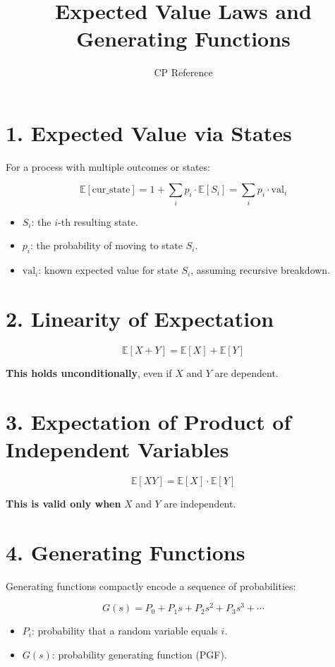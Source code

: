 \documentclass[12pt]{article}
\title{Expected Value Laws and Generating Functions}
\author{CP Reference}
\date{}
\begin{document}
\maketitle

\section*{1. Expected Value via States}

For a process with multiple outcomes or states:

\[
\mathbb{E}[\text{cur\_state}] = 1 + \sum_i p_i \cdot \mathbb{E}[S_i] = \sum_i p_i \cdot \text{val}_i
\]

\begin{itemize}
  \item \( S_i \): the $i$-th resulting state.
  \item \( p_i \): the probability of moving to state \( S_i \).
  \item \( \text{val}_i \): known expected value for state \( S_i \), assuming recursive breakdown.
\end{itemize}

\section*{2. Linearity of Expectation}

\[
\mathbb{E}[X + Y] = \mathbb{E}[X] + \mathbb{E}[Y]
\]

\textbf{This holds unconditionally}, even if \( X \) and \( Y \) are dependent.

\section*{3. Expectation of Product of Independent Variables}

\[
\mathbb{E}[XY] = \mathbb{E}[X] \cdot \mathbb{E}[Y]
\]

\textbf{This is valid only when} \( X \) and \( Y \) are independent.

\section*{4. Generating Functions}

Generating functions compactly encode a sequence of probabilities:

\[
G(s) = P_0 + P_1 s + P_2 s^2 + P_3 s^3 + \cdots
\]

\begin{itemize}
  \item \( P_i \): probability that a random variable equals \( i \).
  \item \( G(s) \): probability generating function (PGF).
\end{itemize}
\end{document}
